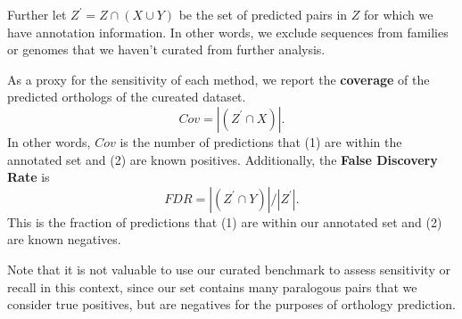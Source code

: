 \documentclass[a4paper,11pt]{article}
\begin{document}
Further let
$Z^{'} = Z \cap (X \cup Y )$
be the set of predicted pairs in $Z$ for which we have annotation information. In other words, we exclude
sequences from families or genomes that we haven’t curated from further analysis.

As a proxy for the sensitivity of each method, we report the \textbf{coverage} of the predicted orthologs of the cureated dataset.
$$Cov = |(Z^{'} \cap X )|.$$
In other words, $Cov$ is the number of predictions that (1) are within the annotated set and (2) are known positives. Additionally, the \textbf{False Discovery Rate} is
$$FDR = |(Z^{'} \cap Y )| / |Z^{'}|.$$
This is the fraction of predictions that (1) are within our annotated set and (2) are known negatives.

Note that it is not valuable to use our curated benchmark to assess sensitivity or recall in this context, since our set contains many paralogous pairs that we consider true positives, but are negatives for the purposes of orthology prediction.
\end{document}
